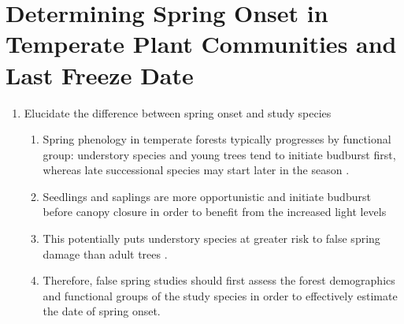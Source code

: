 \documentclass{article}\usepackage[]{graphicx}\usepackage[]{color}
\begin{document}

\section*{Determining Spring Onset in Temperate Plant Communities and Last Freeze Date}
\begin{enumerate}
\item Elucidate the difference between spring onset and study species
\begin{enumerate}
\item Spring phenology in temperate forests typically progresses by functional group: understory species and young trees tend to initiate budburst first, whereas late successional species may start later in the season \citep{Richardson2009, Xin2016}.
\item Seedlings and saplings are more opportunistic and initiate budburst before canopy closure in order to benefit from the increased light levels \citep {Augspurger2008}
\item This potentially puts understory species at greater risk to false spring damage than adult trees \citep{Vitasse2014}.
\item Therefore, false spring studies should first assess the forest demographics and functional groups of the study species in order to effectively estimate the date of spring onset.
\end{enumerate}


\end{enumerate}
\end{document}
